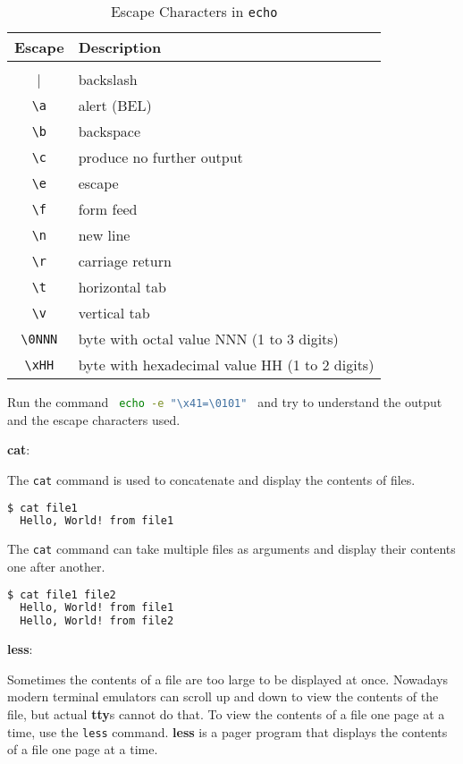 \begin{table}[h!]
\caption{Escape Characters in \lstinline|echo|}
\begin{tabular}{ c l }
  \toprule
 Escape & Description \\
 \midrule
  \lstinline|\\| & backslash \\
  \lstinline|\a| & alert (BEL) \\
  \lstinline|\b| & backspace \\
  \lstinline|\c| & produce no further output \\
  \lstinline|\e| & escape \\
  \lstinline|\f| & form feed \\
  \lstinline|\n| & new line \\
  \lstinline|\r| & carriage return \\
  \lstinline|\t| & horizontal tab \\
  \lstinline|\v| & vertical tab \\
  \lstinline|\0NNN| & byte with octal value NNN (1 to 3 digits) \\
  \lstinline|\xHH| & byte with hexadecimal value HH (1 to 2 digits) \\
  \bottomrule
\end{tabular}
\end{table}

\begin{exercise}
  Run the command
  \lstinline[language=bash]{ echo -e "\x41=\0101" } and try to understand the output and the escape characters used.
\end{exercise}

\textbf{cat}:

The \lstinline|cat| command is used to concatenate and display the contents of files.

\begin{lstlisting}[language=bash]
  $ cat file1
  Hello, World! from file1
\end{lstlisting}

The \lstinline|cat| command can take multiple files as arguments and display their contents one after another.

\begin{lstlisting}[language=bash]
  $ cat file1 file2
  Hello, World! from file1
  Hello, World! from file2
\end{lstlisting}

\textbf{less}:

Sometimes the contents of a file are too large to be displayed at once.
Nowadays modern terminal emulators can scroll up and down to view the contents of the file,
but actual \textbf{tty}s cannot do that.
To view the contents of a file one page at a time, use the \lstinline|less| command.
\textbf{less} is a pager program that displays the contents of a file one page at a time.

